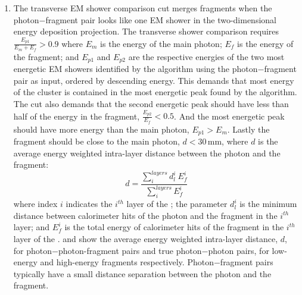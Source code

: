 \begin{enumerate}
  \item The transverse EM shower comparison cut merges fragments when the photon$-$fragment pair looks like one EM shower in the two-dimensional energy deposition projection. The transverse shower comparison requires $\frac{E_{p1}}{E_m + E_f} > 0.9 $ where $E_m$ is the energy of the main photon;  $E_f$ is  the energy of the fragment; and $E_{p1}$ and $E_{p2}$ are the respective energies of the two most energetic EM showers  identified by the \peakFinding algorithm using the photon$-$fragment pair as input, ordered by descending energy. This demands that  most energy of the cluster is contained in the most energetic peak found by the  \peakFinding algorithm. The cut also demands that the second energetic peak should have less than half of the energy in the fragment,  $\frac{E_{p2}}{E_f} < 0.5 $. And the most energetic peak should have more energy than the main photon,   $E_{p1} > E_m$. Lastly the fragment should be close to the main photon, $d < 30 $\,mm, where $d$ is the average energy weighted intra-layer distance between the photon and the fragment:
\begin{equation}
d = \frac{\sum_{i}^{layers}d_l^i \ E_{f}^i}{\sum_{i}^{layers}E_{f}^i}
\end{equation}
where index $i$ indicates the $i^{th}$ layer of the \ECAL; the parameter $d_{l}^i$ is the minimum distance between calorimeter hits of the photon and the fragment in the $i^{th}$ layer; and $E_{f}^i$ is the total energy of calorimeter hits of the fragment in the $i^{th}$ layer of the \ECAL.    and  show the average energy weighted intra-layer distance, $d$, for  photon$-$photon-fragment pairs and true photon$-$photon pairs, for low-energy and high-energy fragments respectively. Photon$-$fragment pairs typically have a small distance separation between the photon and the fragment.

\end{enumerate}
